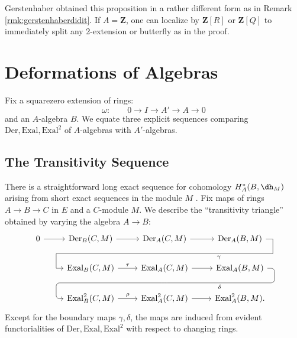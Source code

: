 \documentclass[11pt,reqno]{amsart}
\theoremstyle{definition}
\newcommand{\ZZ}{\mathbf{Z}}
\newcommand{\Der}{\textrm{Der}}
\newcommand{\dd}[1]{\dh_{#1}}
\newcommand{\Exal}{\textrm{Exal}}
\begin{document}
Gerstenhaber obtained this proposition in a rather different form as in Remark \ref{rmk:gerstenhaberdidit}. If $A = \ZZ$, one can localize by $\ZZ[R]$ or $\ZZ[Q]$ to immediately split any 2-extension or butterfly as in the proof. 






\section{Deformations of Algebras}

Fix a squarezero extension of rings:
\begin{equation}\label{eqn:fixextn}
\omega : \qquad 0 \to I \to A' \to A \to 0    
\end{equation}
and an $A$-algebra $B$. We equate three explicit sequences comparing $\Der, \Exal, \Exal^2$ of $A$-algebras with $A'$-algebras. 

\subsection{The Transitivity Sequence}\label{s:transles}


There is a straightforward long exact sequence for cohomology $H_A^*(B, \dd{M})$ arising from short exact sequences in the module $M$ \cite[Theorem 3]{gerstenhaber2}. Fix maps of rings $A \to B \to C$ in $E$ and a $C$-module $M$. We describe the ``transitivity triangle'' \cite[\S II.2.1]{illusie1} obtained by varying the algebra $A \to B$:
\begin{equation}\label{eqn:transles}
\begin{tikzcd}
0 \ar[r] &\Der_B(C, M) \ar[r]  &\Der_A(C, M)\arrow[d, phantom, ""{coordinate, name=Z}]
 \ar[r]   &\Der_A(B, M)  \arrow[dll,
"\gamma"
rounded corners,
to path={ -- ([xshift=2ex]\tikztostart.east)
|- (Z) [near end]\tikztonodes
-| ([xshift=-2ex]\tikztotarget.west)
-- (\tikztotarget)}]      \\
&\Exal_B(C, M) \ar[r, "\tau"]  &\Exal_A(C, M) \arrow[d, phantom, ""{coordinate, name=Y}]
 \ar[r] &\Exal_A(B, M) \arrow[dll,
 "\delta",
rounded corners,
to path={ -- ([xshift=2ex]\tikztostart.east)
|- (Y) [near end]\tikztonodes
-| ([xshift=-2ex]\tikztotarget.west)
-- (\tikztotarget)}] \\
&\Exal_B^2(C, M) \ar[r, "\rho"]     &\Exal_A^2(C, M) \ar[r]    &\Exal_A^2(B, M).
\end{tikzcd}    
\end{equation}
Except for the boundary maps $\gamma, \delta$, the maps are induced from evident functorialities of $\Der, \Exal, \Exal^2$ with respect to changing rings. 
\end{document}
